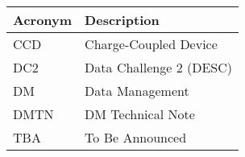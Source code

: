 \addtocounter{table}{-1}
\begin{longtable}{p{}p{}}\hline
\textbf{Acronym} & \textbf{Description}  \\\hline

CCD & Charge-Coupled Device \\\hline
DC2 & Data Challenge 2 (DESC) \\\hline
DM & Data Management \\\hline
DMTN & DM Technical Note \\\hline
TBA & To Be Announced \\\hline
\end{longtable}
